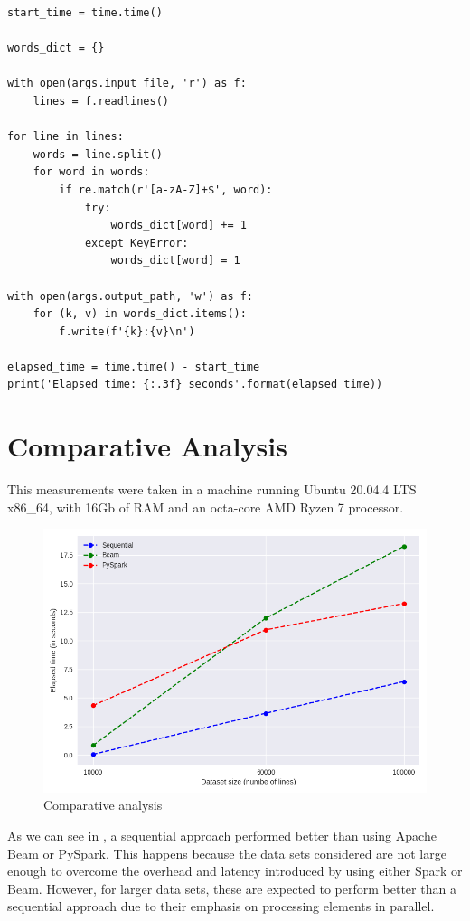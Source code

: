 \documentclass[a4paper, 11pt]{article}
\begin{document}
\begin{verbatim}
start_time = time.time()

words_dict = {}

with open(args.input_file, 'r') as f:
    lines = f.readlines()

for line in lines:
    words = line.split()
    for word in words:
        if re.match(r'[a-zA-Z]+$', word):
            try:
                words_dict[word] += 1
            except KeyError:
                words_dict[word] = 1

with open(args.output_path, 'w') as f:
    for (k, v) in words_dict.items():
        f.write(f'{k}:{v}\n')

elapsed_time = time.time() - start_time
print('Elapsed time: {:.3f} seconds'.format(elapsed_time))
\end{verbatim}

\pagebreak

\section{Comparative Analysis}

This measurements were taken in a machine running Ubuntu 20.04.4 LTS x86\_64, with 16Gb of RAM and 
an octa-core AMD Ryzen 7 processor.

\vspace{\baselineskip}

\begin{figure}[H]
    \centering
    \includegraphics[width=.85\textwidth]{img/plot.png}
    \caption{Comparative analysis}
    \label{fig:plot}
\end{figure}

\vspace{\baselineskip}

As we can see in , a sequential approach performed better than using Apache Beam or 
PySpark. This happens because the data sets considered are not large enough to overcome the 
overhead and latency introduced by using either Spark or Beam. However, for larger data sets, these 
are expected to perform better than a sequential approach due to their emphasis on processing 
elements in parallel.
\end{document}
